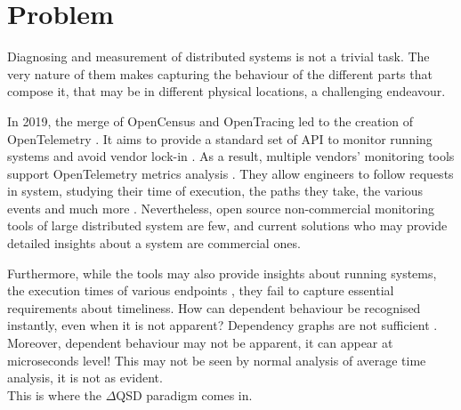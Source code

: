 \section{Problem}
    Diagnosing and measurement of distributed systems is not a trivial task. The very nature of them makes capturing the behaviour of the different parts that compose it, that may be in different physical locations, a challenging endeavour. \cite{dist-m}

    In 2019, the merge of OpenCensus and OpenTracing led to the creation of OpenTelemetry \cite{openc}. It aims to provide a standard set of API to monitor running systems and avoid vendor lock-in \cite{otel-v}. As a result, multiple vendors' monitoring tools support OpenTelemetry metrics analysis \cite{otel-ven}. They allow engineers to follow requests in system, studying their time of execution, the paths they take, the various events and much more \cite{otel-t}. Nevertheless, open source non-commercial monitoring tools of large distributed system are few, and current solutions who may provide detailed insights about a system are commercial ones. \cite{otel-aw} 

    Furthermore, while the tools may also provide insights about running systems, the execution times of various endpoints \cite{jag-spm}, they fail to capture essential requirements about timeliness. How can dependent behaviour be recognised instantly, even when it is not apparent? Dependency graphs are not sufficient \cite{otel-dep}. Moreover, dependent behaviour may not be apparent, it can appear at microseconds level! This may not be seen by normal analysis of average time analysis, it is not as evident. \\
    This is where the $\Delta$QSD paradigm comes in.



